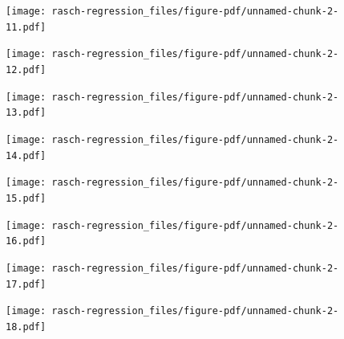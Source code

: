 \documentclass[
  letterpaper,
  DIV=11,
  numbers=noendperiod]{scrreprt}
\begin{document}
\begin{figure}[H]

{\centering \texttt{[image: rasch-regression\_files/figure-pdf/unnamed-chunk-2-11.pdf]}

}

\end{figure}

\begin{figure}[H]

{\centering \texttt{[image: rasch-regression\_files/figure-pdf/unnamed-chunk-2-12.pdf]}

}

\end{figure}

\begin{figure}[H]

{\centering \texttt{[image: rasch-regression\_files/figure-pdf/unnamed-chunk-2-13.pdf]}

}

\end{figure}

\begin{figure}[H]

{\centering \texttt{[image: rasch-regression\_files/figure-pdf/unnamed-chunk-2-14.pdf]}

}

\end{figure}

\begin{figure}[H]

{\centering \texttt{[image: rasch-regression\_files/figure-pdf/unnamed-chunk-2-15.pdf]}

}

\end{figure}

\begin{figure}[H]

{\centering \texttt{[image: rasch-regression\_files/figure-pdf/unnamed-chunk-2-16.pdf]}

}

\end{figure}

\begin{figure}[H]

{\centering \texttt{[image: rasch-regression\_files/figure-pdf/unnamed-chunk-2-17.pdf]}

}

\end{figure}

\begin{figure}[H]

{\centering \texttt{[image: rasch-regression\_files/figure-pdf/unnamed-chunk-2-18.pdf]}

}

\end{figure}
\end{document}

